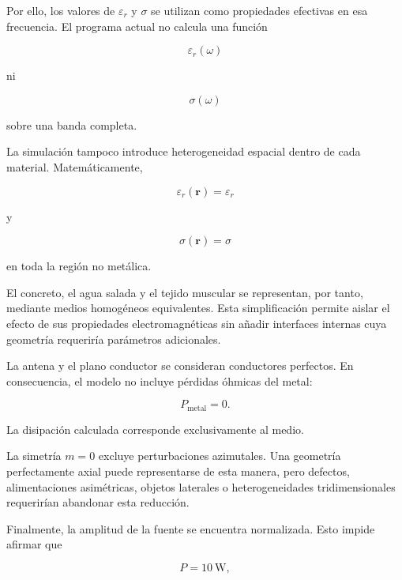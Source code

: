 Por ello, los valores de $\varepsilon_r$ y $\sigma$ se utilizan como propiedades efectivas en esa frecuencia. El programa actual no calcula una función

\begin{equation}
\varepsilon_r(\omega)
\end{equation}

ni

\begin{equation}
\sigma(\omega)
\end{equation}

sobre una banda completa.

La simulación tampoco introduce heterogeneidad espacial dentro de cada material. Matemáticamente,

\begin{equation}
\varepsilon_r(\mathbf r)
=
\varepsilon_r
\end{equation}

y

\begin{equation}
\sigma(\mathbf r)
=
\sigma
\end{equation}

en toda la región no metálica.

El concreto, el agua salada y el tejido muscular se representan, por tanto, mediante medios homogéneos equivalentes. Esta simplificación permite aislar el efecto de sus propiedades electromagnéticas sin añadir interfaces internas cuya geometría requeriría parámetros adicionales.

La antena y el plano conductor se consideran conductores perfectos. En consecuencia, el modelo no incluye pérdidas óhmicas del metal:

\begin{equation}
P_{\mathrm{metal}}=0.
\end{equation}

La disipación calculada corresponde exclusivamente al medio.

La simetría $m=0$ excluye perturbaciones azimutales. Una geometría perfectamente axial puede representarse de esta manera, pero defectos, alimentaciones asimétricas, objetos laterales o heterogeneidades tridimensionales requerirían abandonar esta reducción.

Finalmente, la amplitud de la fuente se encuentra normalizada. Esto impide afirmar que

\begin{equation}
P=10~\mathrm{W},
\end{equation}

